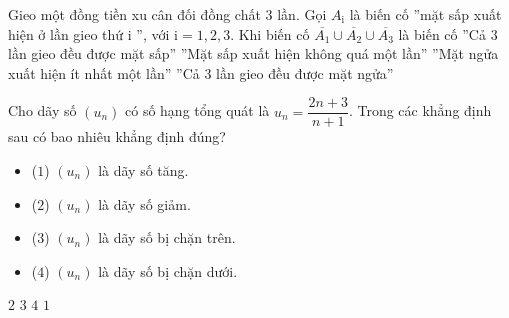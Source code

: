 \begin{ex}%
Gieo một đồng tiền xu cân đối đồng chất $3$ lần. Gọi $A_{\mathrm{i}}$ là biến cố ''mặt sấp xuất hiện ở lần gieo thứ ${\mathrm{i}}$ '', với ${\mathrm{i}}=1,2,3$. Khi biến cố $\overline{A_1}\cup \overline{A_2}\cup \overline{A_3}$ là biến cố
\choice
{''Cả $3$ lần gieo đều được mặt sấp''}
{''Mặt sấp xuất hiện không quá một lần''}
{\True ''Mặt ngửa xuất hiện ít nhất một lần''}
{''Cả $3$ lần gieo đều được mặt ngửa''}
\end{ex}
\begin{ex}%
Cho dãy số $\left(u_n\right)$ có số hạng tổng quát là $u_n=\dfrac{2n+3}{n+1}$. Trong các khẳng định sau có bao nhiêu khẳng định đúng?
\begin{multicols}{2}
	\begin{itemize}
		\item	($1$) $\left(u_n\right)$ là dãy số tăng.
		\item	($2$) $\left(u_n\right)$ là dãy số giảm.
		\item	($3$) $\left(u_n\right)$ là dãy số bị chặn trên.
		\item	($4$) $\left(u_n\right)$ là dãy số bị chặn dưới.
	\end{itemize}  
\end{multicols}
\choice
	{$2$}
	{\True $3$}
	{$4$}
	{$1$}
\end{ex}
